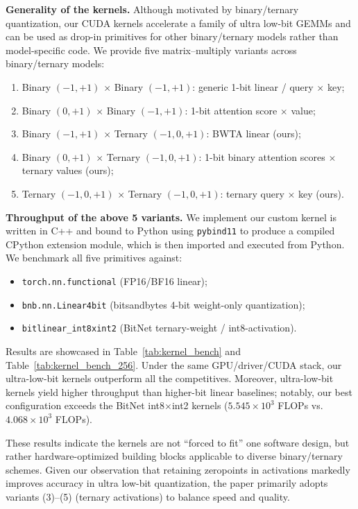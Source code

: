 \begin{revresponse}[]
\textbf{Generality of the kernels.} Although motivated by binary/ternary quantization, our CUDA kernels accelerate a family of ultra low-bit GEMMs and can be used as drop-in primitives for other binary/ternary models rather than model-specific code. 
We provide five matrix–multiply variants across binary/ternary models:
\begin{enumerate}[label={(\arabic*) }]
    \item Binary $(−1,+1)$ $\times$ Binary $(−1,+1)$: generic 1-bit linear / query $\times$ key;
    \item Binary $(0,+1)$ $\times$ Binary $(−1,+1)$: 1-bit attention score $\times$ value;
    \item Binary $(−1,+1)$ $\times$ Ternary $(−1,0,+1)$: BWTA linear (ours);
    \item Binary $(0,+1)$ $\times$ Ternary $(−1,0,+1)$: 1-bit binary attention scores $\times$ ternary values (ours); 
    \item Ternary $(−1,0,+1)$ $\times$ Ternary $(−1,0,+1)$: ternary query $\times$ key (ours). 
\end{enumerate}

\textbf{Throughput of the above 5 variants. } We implement our custom kernel is written in C++ and bound to Python using \texttt{pybind11} to produce a compiled CPython extension module, which is then imported and executed from Python. We benchmark all five primitives against:
\begin{itemize}
    \item \texttt{torch.nn.functional} (FP16/BF16 linear); 
    \item \texttt{bnb.nn.Linear4bit} (bitsandbytes 4-bit weight-only quantization); 
    \item \texttt{bitlinear\_int8xint2} (BitNet ternary-weight / int8-activation). 
\end{itemize}
Results are showcased in Table~\ref{tab:kernel_bench} and Table~\ref{tab:kernel_bench_256}. Under the same GPU/driver/CUDA stack, our ultra-low-bit kernels outperform all the competitives. Moreover, ultra-low-bit kernels yield higher throughput than higher-bit linear baselines; notably, our best configuration exceeds the BitNet int8$\times$int2 kernels ($5.545\times10^3$ FLOPs vs. $4.068\times10^3$ FLOPs). 

These results indicate the kernels are not ``forced to fit'' one software design, but rather hardware-optimized building blocks applicable to diverse binary/ternary schemes. Given our observation that retaining zeropoints in activations markedly improves accuracy in ultra low-bit quantization, the paper primarily adopts variants (3)–(5) (ternary activations) to balance speed and quality. 



\end{revresponse}


